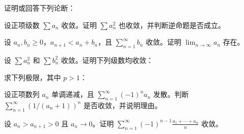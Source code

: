 \noindent\begin{minipage}{\textwidth}
证明或回答下列论断：
\end{minipage}\par\vfill
\noindent\begin{minipage}{\textwidth}
设正项级数 $\sum a_n$ 收敛。证明 $\sum a_n^2$ 也收敛，并判断逆命题是否成立。
\end{minipage}\par\vfill
\noindent\begin{minipage}{\textwidth}
设 $a_n,b_n\ge0$，$a_{n+1}<a_n+b_n$，且 $\sum_{n=1}^{\infty}b_n$ 收敛。证明 $\lim_{n\to\infty}a_n$ 存在。
\end{minipage}\par\vfill
\newpage
\noindent\begin{minipage}{\textwidth}
设 $\sum a_n^2$ 和 $\sum b_n^2$ 收敛。证明下列级数均收敛：
\end{minipage}\par\vfill
\noindent\begin{minipage}{\textwidth}
求下列极限，其中 $p>1$：
\end{minipage}\par\vfill
\noindent\begin{minipage}{\textwidth}
设正项数列 $a_n$ 单调递减，且 $\sum_{n=1}^{\infty}(-1)^n a_n$ 发散。判断 $\sum_{n=1}^{\infty}(1/(a_n+1))^n$ 是否收敛，并说明理由。
\end{minipage}\par\vfill
\noindent\begin{minipage}{\textwidth}
设 $a_n>a_{n+1}>0$ 且 $a_n\to0$。证明 $\displaystyle\sum_{n=1}^{\infty}(-1)^{n-1}\frac{a_1+\cdots+a_n}{n}$ 收敛。
\end{minipage}\par\vfill
